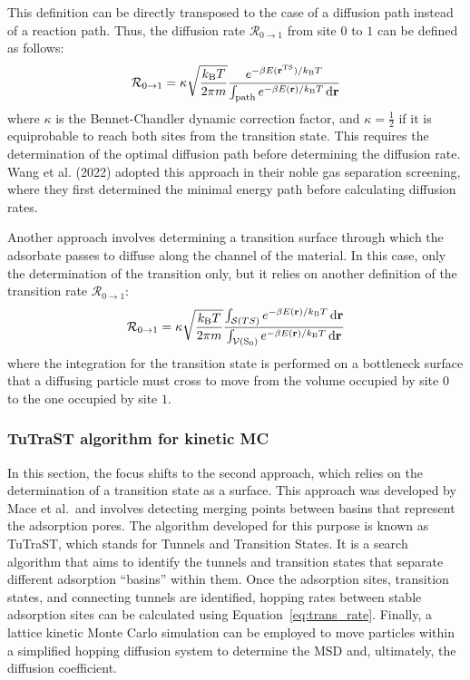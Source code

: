 \documentclass[main]{subfiles}
\begin{document}
This definition can be directly transposed to the case of a diffusion path instead of a reaction path. Thus, the diffusion rate $\mathcal{R}_{0\rightarrow 1}$ from site $0$ to $1$ can be defined as follows:
\begin{equation}\label{eq:trans_rate_path}
  \mathcal{R}_{0\rightarrow 1} = \kappa\sqrt{\frac{k_{\text{B}}T}{2\pi m}}\frac{e^{-\beta E(\mathbf{r}^{\text{TS}})/k_{\text{B}}T}}{\int_{\text{path}}e^{-\beta E(\mathbf{r})/k_{\text{B}}T}\mathop{}\mathopen{}\mathrm{d}\mathbf{r}}
\end{equation}
where $\kappa$ is the Bennet-Chandler dynamic correction factor,\autocite{BENNETT1977} and $\kappa=\tfrac{1}{2}$ if it is equiprobable to reach both sites from the transition state. This requires the determination of the optimal diffusion path before determining the diffusion rate. Wang et al. (2022) adopted this approach in their noble gas separation screening, where they first determined the minimal energy path before calculating diffusion rates.\autocite{Wang_2022}

Another approach involves determining a transition surface through which the adsorbate passes to diffuse along the channel of the material. In this case, only the determination of the transition only, but it relies on another definition of the transition rate $\mathcal{R}_{0\rightarrow 1}$:
\begin{equation}\label{eq:trans_rate}
  \mathcal{R}_{0\rightarrow 1} = \kappa\sqrt{\frac{k_{\text{B}}T}{2\pi m}}\frac{\int_{\mathcal{S}(TS)}e^{-\beta E(\mathbf{r})/k_{\text{B}}T}\mathop{}\mathopen{}\mathrm{d}\mathbf{r}}{\int_{\mathcal{V}(\text{S}_0)}e^{-\beta E(\mathbf{r})/k_{\text{B}}T}\mathop{}\mathopen{}\mathrm{d}\mathbf{r}}
\end{equation}
where the integration for the transition state is performed on a bottleneck surface that a diffusing particle must cross to move from the volume occupied by site $0$ to the one occupied by site $1$.

\subsubsection{TuTraST algorithm for kinetic MC}\label{sct:tutrast}

In this section, the focus shifts to the second approach, which relies on the determination of a transition state as a surface. This approach was developed by Mace et al.\autocite{Mace_2019}\ and involves detecting merging points between basins that represent the adsorption pores. The algorithm developed for this purpose is known as TuTraST,  which stands for Tunnels and Transition States. It is a search algorithm that aims to identify the tunnels and transition states that separate different adsorption ``basins'' within them. Once the adsorption sites, transition states, and connecting tunnels are identified, hopping rates between stable adsorption sites can be calculated using Equation~\ref{eq:trans_rate}. Finally, a lattice kinetic Monte Carlo simulation can be employed to move particles within a simplified hopping diffusion system to determine the MSD and, ultimately, the diffusion coefficient.
\end{document}
